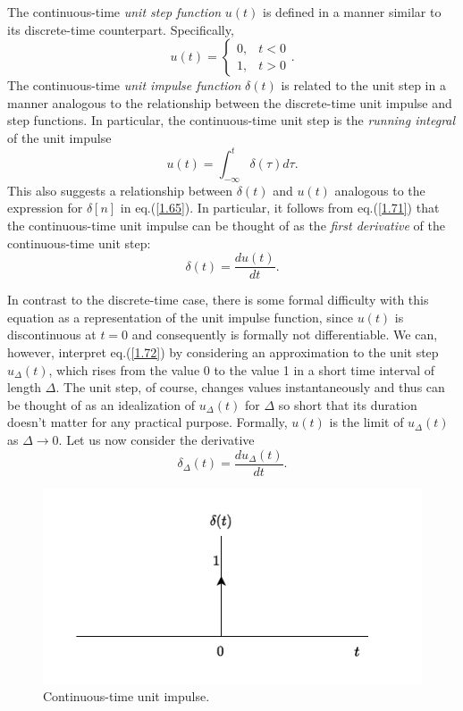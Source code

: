 \documentclass[a4paper,twoside]{book}
\begin{document}
The continuous-time \textit{unit step function} $u(t)$ is defined in a manner similar to its discrete-time counterpart. Specifically,
\begin{equation}
    u(t) = \left\{\begin{array}{ll}{0,}&{t<0}\\{1,}&{t>0}\end{array}\right..
    \label{1.70}
\end{equation}
The continuous-time \textit{unit impulse function} $\delta(t)$ is related to the unit step in a manner analogous to the relationship between the discrete-time unit impulse and step functions. In particular, the continuous-time unit step is the \textit{running integral} of the unit impulse
\begin{equation}
    u(t)=\int_{-\infty}^{t}\delta(\tau)d\tau.
    \label{1.71}
\end{equation}
This also suggests a relationship between $\delta(t)$ and $u(t)$ analogous to the expression for $\delta[n]$ in eq.\;(\ref{1.65}). In particular, it follows from eq.\;(\ref{1.71}) that the continuous-time unit impulse can be thought of as the \textit{first derivative} of the continuous-time unit step:
\begin{equation}
    \delta(t)=\dfrac{du(t)}{dt}.
    \label{1.72}
\end{equation}

In contrast to the discrete-time case, there is some formal difficulty with this equation as a representation of the unit impulse function, since $u(t)$ is discontinuous at $t=0$ and consequently is formally not differentiable. We can, however, interpret eq.\;(\ref{1.72}) by considering an approximation to the unit step $u_{\Delta}(t)$, which rises from the value 0 to the value 1 in a short time interval of length $\Delta$. The unit step, of course, changes values instantaneously and thus can be thought of as an idealization of $u_{\Delta}(t)$ for $\Delta$ so short that its duration doesn't matter for any practical purpose. Formally, $u(t)$ is the limit of $u_{\Delta}(t)$ as $\Delta\to 0$. Let us now consider the derivative
\begin{equation}
    \delta_{\Delta}(t)=\dfrac{du_{\Delta}(t)}{dt}.
    \label{1.73}
\end{equation}

\begin{figure}[htbp]
    \centering
    \includegraphics[width=\linewidth]{Fig1.pdf}
    \caption{Continuous-time unit impulse.}
    \label{Fig1}
\end{figure}
\end{document}
